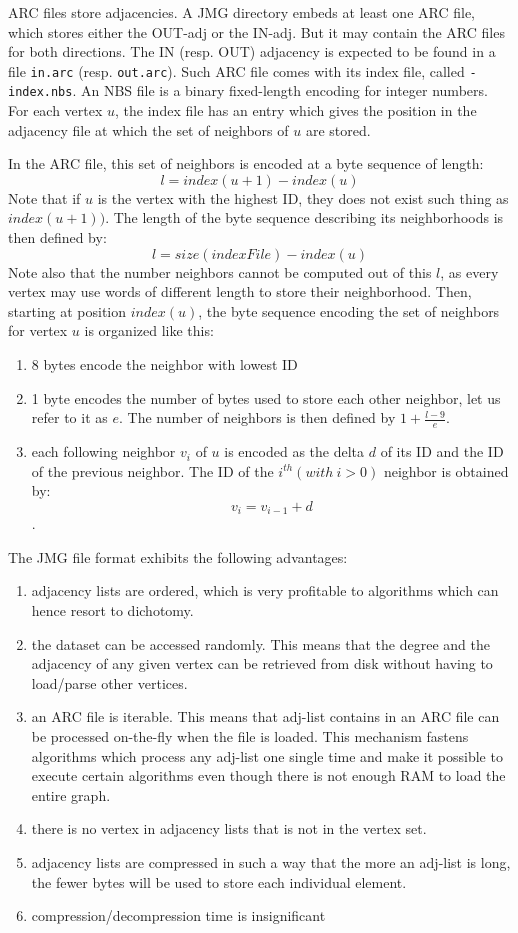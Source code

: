 \documentclass[11pt,a4paper]{article}
\begin{document}
ARC files store adjacencies. A JMG directory embeds at least one ARC file, which stores either the OUT-adj or the IN-adj. But it may contain the ARC files for both directions.
The IN (resp. OUT) adjacency is expected to be found in a file \texttt{in.arc} (resp. \texttt{out.arc}). Such ARC file comes with its index file, called \texttt{-index.nbs}. An NBS file is a binary fixed-length encoding for integer numbers.
For each vertex $u$, the index file has an entry which gives the position in the adjacency file at which the set of neighbors of $u$ are stored.

In the ARC file, this set of neighbors is encoded at a byte sequence of length:
$$l = index(u+1) - index(u)$$
 Note that if $u$ is the vertex with the highest ID,  they does not exist such thing as $index(u+1))$. The length of the byte sequence describing its neighborhoods is then defined by:
 $$l = size(indexFile) - index(u)$$
Note also that the number neighbors cannot be computed out of this $l$, as every vertex may use words of different length to store their neighborhood.
Then, starting at position $index(u)$, the byte sequence encoding the set of neighbors for vertex $u$ is organized like this:
\begin{enumerate}
\item 8 bytes encode the neighbor with lowest ID
\item 1 byte encodes the number of bytes used to store each other neighbor, let us refer to it as $e$. The number of neighbors is then defined by $1 + \frac{l - 9}{e}$.
\item each following neighbor $v_i$ of $u$ is encoded as the delta $d$ of its ID and the ID of the previous neighbor.
The ID of the $i^{th} (with\ i > 0)$ neighbor is obtained by:
$$v_i = v_{i-1} + d$$.
\end{enumerate}

The JMG file format exhibits the following advantages:
\begin{enumerate}
\item adjacency lists are ordered, which is very profitable to algorithms which can hence resort to dichotomy.
\item the dataset can be accessed randomly. This means that the degree and the adjacency of any given vertex can be retrieved from disk without having to load/parse other vertices.
\item an ARC file is iterable. This means that adj-list contains in an ARC file can be processed on-the-fly when the file is loaded. This mechanism fastens algorithms which process any adj-list one single time and make it possible to execute certain algorithms even though there is not enough RAM to load the entire graph.
\item there is no vertex in adjacency lists that is not in the vertex set.
\item adjacency lists are compressed in such a way that the more an adj-list is long, the fewer bytes will be used to store each individual element.
\item compression/decompression time is insignificant
\end{enumerate}
\end{document}

